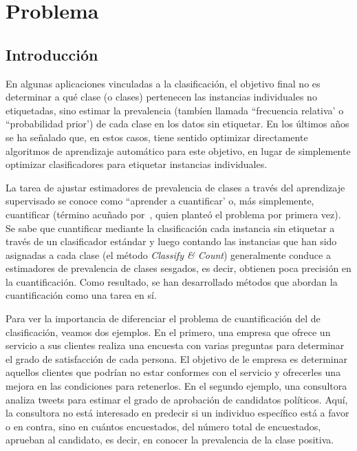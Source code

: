 \chapter{Problema}

\section{Introducción}

En algunas aplicaciones vinculadas a la clasificación, el objetivo final no es
determinar a qué clase (o clases) pertenecen las instancias individuales no
etiquetadas, sino estimar la prevalencia (tambíen llamada ``frecuencia relativa'
o ``probabilidad prior') de cada clase en los datos sin etiquetar. En los
últimos años se ha señalado que, en estos casos, tiene sentido optimizar
directamente algoritmos de aprendizaje automático para este objetivo, en lugar
de simplemente optimizar clasificadores para etiquetar instancias individuales.

La tarea de ajustar estimadores de prevalencia de clases a través del
aprendizaje supervisado se conoce como ``aprender a cuantificar' o, más
simplemente, cuantificar (término acuñado por~\citet{forman2005counting}, quien
planteó el problema por primera vez). Se sabe que cuantificar mediante la
clasificación cada instancia sin etiquetar a través de un clasificador estándar
y luego contando las instancias que han sido asignadas a cada clase (el método
{\it Classify \& Count\/}) generalmente conduce a estimadores de prevalencia de
clases sesgados, es decir, obtienen poca precisión en la cuantificación. Como
resultado, se han desarrollado métodos que abordan la cuantificación como una
tarea en sí.

Para ver la importancia de diferenciar el problema de cuantificación del de
clasificación, veamos dos ejemplos. En el primero, una empresa que ofrece un
servicio a sus clientes realiza una encuesta con varias preguntas para
determinar el grado de satisfacción de cada persona. El objetivo de le empresa
es determinar aquellos clientes que podrían no estar conformes con el servicio y
ofrecerles una mejora en las condiciones para retenerlos. En el segundo ejemplo,
una consultora analiza tweets para estimar el grado de aprobación de candidatos
políticos. Aquí, la consultora no está interesado en predecir si un individuo
específico está a favor o en contra, sino en cuántos encuestados, del número
total de encuestados, aprueban al candidato, es decir, en conocer la prevalencia
de la clase positiva.

